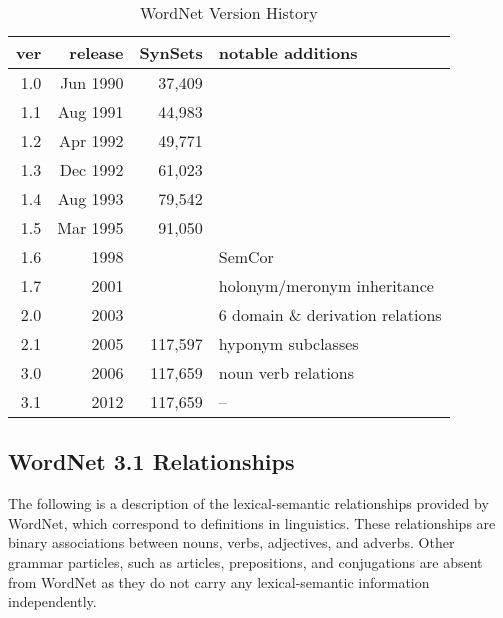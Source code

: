
\begin{table}[]
\centering
\begin{tabular}{|r|r|r|l|}
\hline
ver & release & SynSets & notable additions \\
\hline
1.0 & Jun 1990 & 37,409 &  \\
1.1 & Aug 1991 & 44,983 &  \\
1.2 & Apr 1992 & 49,771 &  \\
1.3 & Dec 1992 & 61,023 &  \\
1.4 & Aug 1993 & 79,542 &  \\
1.5 & Mar 1995 & 91,050 &  \\ %
1.6 & 1998 &  & SemCor  \cite{semcor}\\
1.7 & 2001 &  & holonym/meronym inheritance \\ %
2.0 & 2003 &  & 6 domain \& derivation relations \\ %
2.1 & 2005 & 117,597 & hyponym subclasses \\ %
3.0 & 2006 & 117,659 & noun verb relations \\ %
3.1 & 2012 & 117,659 & -- \\
\hline
\end{tabular}
\caption{WordNet Version History}
\label{wordnet-history}
\end{table}

\subsection{WordNet 3.1 Relationships}
The following is a description of the lexical-semantic relationships provided by WordNet, which correspond to definitions in linguistics. These relationships are binary associations between nouns, verbs, adjectives, and adverbs. Other grammar particles, such as articles, prepositions, and conjugations are absent from WordNet as they do not carry any lexical-semantic information independently.

